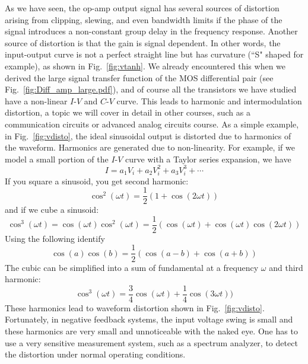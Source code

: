 As we have seen, the op-amp output signal has several sources of distortion arising from clipping, slewing, and even bandwidth limits if the phase of the signal introduces a non-constant group delay in the frequency response.  Another source of distortion is that the gain is signal dependent.  In other words, the input-output curve is not a perfect straight line but has curvature (``S" shaped for example), as shown in Fig.~\ref{fig:vtanh}.  We already encountered this when we derived the large signal transfer function of the MOS differential pair (see Fig.~\ref{fig:Diff_amp_large.pdf}), and of course all the transistors we have studied have a non-linear $I$-$V$ and $C$-$V$ curve.  This leads to harmonic and intermodulation distortion, a topic we will cover in detail in other courses, such as a communication circuits or advanced analog circuits course.  As a simple example, in Fig.~\ref{fig:vdisto}, the ideal sinusoidal output is distorted due to harmonics of the waveform.  Harmonics are generated due to non-linearity.  For example, if we model a small portion of the $I$-$V$ curve with a Taylor series expansion, we have
%
\begin{equation}
	I = a_1 V_i + a_2 V_i^2 + a_3 V_i^3 + \cdots
\end{equation}
%
If you square a sinusoid, you get second harmonic:
%
\begin{equation}
	\cos^2(\omega t) = \frac{1}{2} \left(1 + \cos(2 \omega t) \right)
\end{equation}
%
and if we cube a sinusoid:
%
\begin{equation}
	\cos^3(\omega t) = \cos(\omega t) \cos^2(\omega t) = \frac{1}{2} \left(\cos(\omega t) + \cos(\omega t)\cos(2 \omega t) \right)
\end{equation}
%
Using the following identify
%
\begin{equation}
	\cos(a) \cos(b) = \frac{1}{2} \left( \cos(a - b) + \cos(a + b) \right) 
\end{equation}
%
The cubic can be simplified into a sum of fundamental at a frequency $\omega$ and third harmonic:
%
\begin{equation}
	\cos^3(\omega t) =  \frac{3}{4} \cos(\omega t) + \frac{1}{4} \cos(3 \omega t)) 	
\end{equation}
%
These harmonics lead to waveform distortion shown in Fig.~\ref{fig:vdisto}.  Fortunately, in negative feedback systems, the input voltage swing is small and these harmonics are very small and unnoticeable with the naked eye.  One has to use a very sensitive measurement system, such as a spectrum analyzer, to detect the distortion under normal operating conditions.


